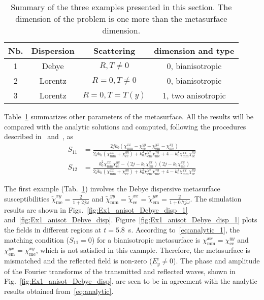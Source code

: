 \documentclass[journal]{IEEEtran}
\begin{document}
\begin{table}[h]
\caption{Summary of the three examples presented in this section. The dimension of the problem is one more than the metasurface dimension.}\label{tb:summary_ex}
  \centering
  \begin{tabular}{|c|c|c|c|}
  \hline
  Nb. & Dispersion & Scattering & dimension and type \\\hline
  1 & Debye & $R,T\neq0$ & 0, bianisotropic \\\hline
  2 & Lorentz & $R=0,T\neq0$ & 0, bianisotropic \\\hline
  3 & Lorentz & $R=0, T=T(y)$ & 1, two anisotropic \\
  \hline
\end{tabular}
\end{table}
Table~\ref{tb:summary_ex} summarizes other parameters of the metasurface. All the results will be compared with the analytic solutions and computed, following the procedures described in~\cite{Karim_ms_suscp_syn_2015} and~\cite{Lavigne_Refr_ms_no_spurious_diffr2018}, as
\begin{subequations}\label{eq:analytic}
  \begin{align}\label{eq:analytic_1}
  S_{11}&=\frac{2jk_0\left(\chi_\textrm{mm}^{xx}-\chi_\textrm{ee}^{yy}+\chi_\textrm{em}^{yx}-\chi_\textrm{me}^{xy}\right)}{2jk_0\left( \chi_\textrm{mm}^{xx}+\chi_\textrm{ee}^{yy}\right)+k_0^2\chi_\textrm{em}^{yx}\chi_\textrm{me}^{xy}+4-k_0^2 \chi_\textrm{mm}^{xx}\chi_\textrm{ee}^{yy}} \\\label{eq:analytic_2}
  S_{12}&=\frac{k_0^2\chi_\textrm{mm}^{xx}\chi_\textrm{ee}^{yy}-\left(2j-k_0\chi_\textrm{em}^{yx}\right) \left(2j-k_0\chi_\textrm{me}^{xy}\right)}{2jk_0\left( \chi_\textrm{mm}^{xx}+\chi_\textrm{ee}^{yy}\right)+k_0^2\chi_\textrm{em}^{yx}\chi_\textrm{me}^{xy}+4-k_0^2 \chi_\textrm{mm}^{xx}\chi_\textrm{ee}^{yy}}
\end{align}
\end{subequations}

The first example (Tab.~\ref{tb:summary_ex}) involves the Debye dispersive metasurface susceptibilities $\tilde{\chi}_\textrm{me}^{xy}=\frac{2}{1+2j\omega}$ and $\tilde{\chi}_\textrm{mm}^{yy}=\tilde{\chi}_\textrm{ee}^{xx}=\tilde{\chi}_\textrm{em}^{yx}=\frac{2}{1+0.7j\omega}$. The simulation results are shown in Figs.~\ref{fig:Ex1_anisot_Debye_disp_1} and~\ref{fig:Ex1_anisot_Debye_disp}. Figure~\ref{fig:Ex1_anisot_Debye_disp_1} plots the fields in different regions at $t=5.8$~s. According to~\eqref{eq:analytic_1}, the matching condition ($S_{11}=0$) for a bianisotropic metasurface is $\chi_\textrm{mm}^{xx}=\chi_\textrm{ee}^{yy}$ and $\chi_\textrm{em}^{yx}=\chi_\textrm{me}^{xy}$, which is not satisfied in this example. Therefore, the metasurface is mismatched and the reflected field is non-zero ($E_y^\textrm{r}\neq0$). The phase and amplitude of the Fourier transforms of the transmitted and reflected waves, shown in Fig.~\ref{fig:Ex1_anisot_Debye_disp}, are seen to be in agreement with the analytic results obtained from~\eqref{eq:analytic}.
\end{document}
